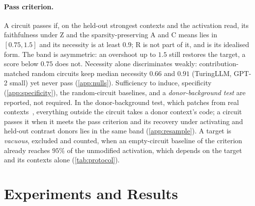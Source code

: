 \documentclass[10pt]{article}
\newif\ifexternal
\DeclareRobustCommand{\pending}[1]{%
  \ifexternal
    \ifvmode\textcolor{black!55}{[to be added]}\else\unskip\fi
  \else
    \textcolor{red!70!black}{[\textit{pending: #1}]}%
  \fi}
\begin{document}
\paragraph{Pass criterion.}
A circuit passes if, on the held-out strongest contexts and the activation read, its faithfulness under Z and the sparsity-preserving A and C means lies in $[0.75, 1.5]$ and its necessity is at least $0.9$; R is not part of it, and  is its idealised form.
The band is asymmetric: an overshoot up to $1.5$ still restores the target, a score below $0.75$ does not.
Necessity alone discriminates weakly: contribution-matched random circuits keep median necessity $0.66$ and $0.91$ (TuringLLM, GPT-2 small) yet never pass (\cref{app:nulls}).
Sufficiency to induce, specificity (\cref{app:specificity}), the random-circuit baselines, and a \emph{donor-background test} are reported, not required.
In the donor-background test, which patches from real contexts~\citep{heimersheim2024patching}, everything outside the circuit takes a donor context's code; a circuit passes it when it meets the pass criterion and its recovery under activating and held-out contrast donors lies in the same band (\cref{app:resample}).
A target is \emph{vacuous}, excluded and counted, when an empty-circuit baseline of the criterion already reaches $95\%$ of the unmodified activation, which depends on the target and its contexts alone (\cref{tab:protocol}).
\section{Experiments and Results}
\label{sec:results}

\end{document}
